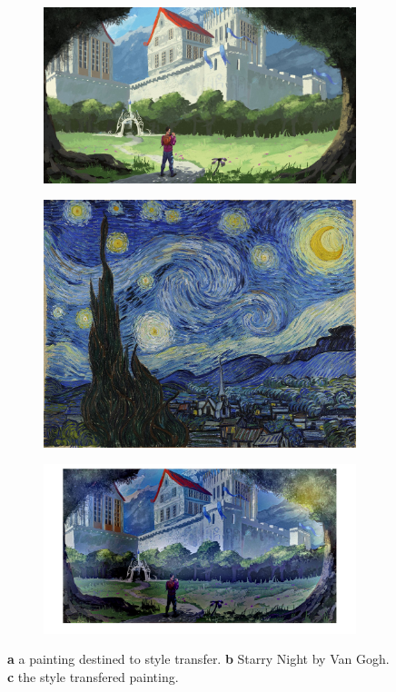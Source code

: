 \documentclass[a4paper]{iacas}
\begin{document}
\begin{figure}[!htbp]
	
	\begin{subfigure}[b]{0.48\textwidth}
		\includegraphics[width=\textwidth]{my_pic.jpg}
		\caption{}
		\label{fig:image_1_custom}
	\end{subfigure}
	\begin{subfigure}[b]{0.48\textwidth}
		\includegraphics[width=\textwidth]{starry_night.jpg}
		\caption{}
		\label{fig:image_2_custom}
	\end{subfigure}

	\begin{subfigure}[b]{0.65\textwidth}
		\includegraphics[width=\textwidth]{image_custom.jpg}
		\caption{}
		\label{fig:image_fused_custom}
	\end{subfigure}
	
	\caption{\textbf{a} a painting destined to style transfer. \textbf{b} Starry Night by Van Gogh. \textbf{c} the style transfered painting.}
	\label{fig:Custom}
\end{figure}
\end{document}
